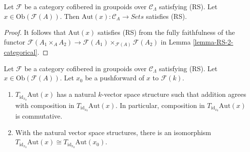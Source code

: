 \begin{lemma}
\label{lemma-Aut-functor-RS}
Let $\mathcal{F}$ be a category cofibered in groupoids over $\mathcal 
C_\Lambda$ satisfying (RS).  Let $x \in \text{Ob}(\mathcal 
F(A))$.  Then $\text{Aut}(x): \mathcal{C}_{A} \to 
\textit{Sets}$ satisfies (RS).
\end{lemma}

\begin{proof}
It follows that $\text{Aut}(x)$ satisfies (RS) from the fully 
faithfulness of the functor $\mathcal{F}(A_1 \times_{A} A_2) \to 
\mathcal{F}(A_1) \times_{\mathcal{F}(A)} \mathcal{F}(A_2)$ in
Lemma \ref{lemma-RS-2-categorical}.
\end{proof}

\begin{lemma}
\label{lemma-Aut-functor-tangent-space}
Let $\mathcal{F}$ be a category cofibered in groupoids over $\mathcal 
C_\Lambda$ satisfying (RS).  Let $x \in \text{Ob}(\mathcal 
F(A))$.  Let $x_0$ be a pushforward of $x$ to $\mathcal{F}(k)$.
\begin{enumerate}
\item $T_{\text{id}_{x_0}} \text{Aut}(x)$ has a natural $k$-vector 
space structure such that addition agrees with composition in 
$T_{\text{id}_{x_0}} \text{Aut}(x)$.  In particular, composition in 
$T_{\text{id}_{x_0}} \text{Aut}(x)$ is commutative.
\item With the natural vector space structures, there is an isomorphism 
$T_{\text{id}_{x_0}} \text{Aut}(x) \cong T_{\text{id}_{x_0}} 
\text{Aut}(x_0)$.
\end{enumerate}
\end{lemma}

